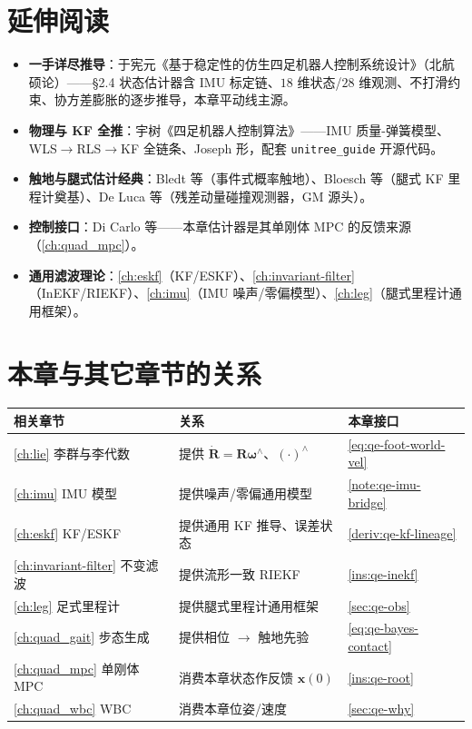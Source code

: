 \section*{延伸阅读}
\begin{itemize}
  \item \textbf{一手详尽推导}：于宪元《基于稳定性的仿生四足机器人控制系统设计》\cite{yu2021quadruped}（北航硕论）——§2.4 状态估计器含 IMU 标定链、$18$ 维状态/$28$ 维观测、不打滑约束、协方差膨胀的逐步推导，本章平动线主源。
  \item \textbf{物理与 KF 全推}：宇树《四足机器人控制算法》\cite{unitree2023quadruped}——IMU 质量-弹簧模型、WLS$\to$RLS$\to$KF 全链条、Joseph 形，配套 \texttt{unitree\_guide} 开源代码。
  \item \textbf{触地与腿式估计经典}：Bledt 等\cite{bledt2018contact}（事件式概率触地）、Bloesch 等\cite{bloesch2013state}（腿式 KF 里程计奠基）、De Luca 等\cite{deluca2006collision}（残差动量碰撞观测器，GM 源头）。
  \item \textbf{控制接口}：Di Carlo 等\cite{dicarlo2018cheetah}——本章估计器是其单刚体 MPC 的反馈来源（\cref{ch:quad_mpc}）。
  \item \textbf{通用滤波理论}：\cref{ch:eskf}（KF/ESKF）、\cref{ch:invariant-filter}（InEKF/RIEKF）、\cref{ch:imu}（IMU 噪声/零偏模型）、\cref{ch:leg}（腿式里程计通用框架）。
\end{itemize}

\section*{本章与其它章节的关系}
\begin{table}[H]\centering\small
\begin{tabular}{lll}
\toprule
相关章节 & 关系 & 本章接口 \\
\midrule
\cref{ch:lie} 李群与李代数 & 提供 $\dot{\mathbf{R}}=\mathbf{R}\boldsymbol\omega^\wedge$、$(\cdot)^\wedge$ & \cref{eq:qe-foot-world-vel} \\
\cref{ch:imu} IMU 模型 & 提供噪声/零偏通用模型 & \cref{note:qe-imu-bridge} \\
\cref{ch:eskf} KF/ESKF & 提供通用 KF 推导、误差状态 & \cref{deriv:qe-kf-lineage} \\
\cref{ch:invariant-filter} 不变滤波 & 提供流形一致 RIEKF & \cref{ins:qe-inekf} \\
\cref{ch:leg} 足式里程计 & 提供腿式里程计通用框架 & \cref{sec:qe-obs} \\
\cref{ch:quad_gait} 步态生成 & 提供相位 $\to$ 触地先验 & \cref{eq:qe-bayes-contact} \\
\cref{ch:quad_mpc} 单刚体 MPC & 消费本章状态作反馈 $\boldsymbol x(0)$ & \cref{ins:qe-root} \\
\cref{ch:quad_wbc} WBC & 消费本章位姿/速度 & \cref{sec:qe-why} \\
\bottomrule
\end{tabular}
\end{table}


